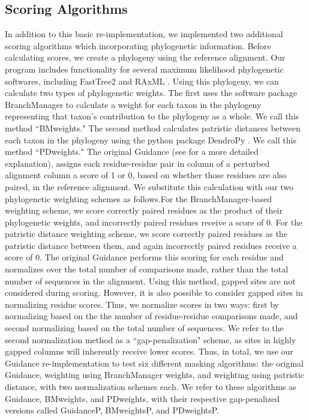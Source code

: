\documentclass[10pt]{article}
\begin{document}
\subsection*{Scoring Algorithms}
In addition to this basic re-implementation, we implemented two additional scoring algorithms which incorporating phylogenetic information. Before calculating scores, we create a phylogeny using the reference alignment. Our program includes functionality for several maximum likelihood phylogenetic softwares, including FastTree2 \citep{Price2010} and RAxML \citep{Stamatakis2006}. Using this phylogeny, we can calculate two types of phylogenetic weights. The first uses the software package BranchManager \citep{Stone2007} to calculate a weight for each taxon in the phylogeny representing that taxon's contribution to the phylogeny as a whole. We call this method ``BMweights." The second method calculates patristic distances between each taxon in the phylogeny using the python package DendroPy \citep{Sukumaran2010}. We call this method ``PDweights."
The original Guidance (see \citep{Penn2010} for a more detailed explanation), assigns each residue-residue pair in column of a perturbed alignment column a score of 1 or 0, based on whether those residues are also paired, in the reference alignment. We substitute this calculation with our two phylogenetic weighting schemes as follows.For the BranchManager-based weighting scheme, we score correctly paired residues as the product of their phylogenetic weights, and incorrectly paired residues receive a score of 0. For the patristic distance weighting scheme, we score correctly paired residues as the patristic distance between them, and again incorrectly paired residues receive a score of 0.
The original Guidance performs this scoring for each residue and normalizes over the total number of comparisons made, rather than the total number of sequences in the alignment. Using this method, gapped sites are not considered during scoring. However, it is also possible to consider gapped sites in normalizing residue scores. Thus, we normalize scores in two ways: first by normalizing based on the the number of residue-residue comparisons made, and second normalizing based on the total number of sequences. We refer to the second normalization method as a ``gap-penalization" scheme, as sites in highly gapped columns will inherently receive lower scores.
Thus, in total, we use our Guidance re-implementation to test six different masking algorithms: the original Guidance, weighting using BranchManager weights, and weighting using patristic distance, with two normalization schemes each. We refer to these algorithms as Guidance, BMweights, and PDweights, with their respective gap-penalized versions called GuidanceP, BMweightsP, and PDweightsP.
\end{document}
